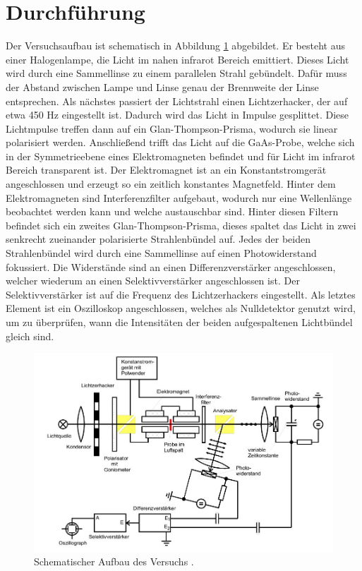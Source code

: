 \section{Durchführung}
\label{sec:Durchführung}
Der Versuchsaufbau ist schematisch in Abbildung \ref{fig:1} abgebildet.
Er besteht aus einer Halogenlampe, die Licht im nahen infrarot Bereich emittiert.
Dieses Licht wird durch eine Sammellinse zu einem parallelen Strahl gebündelt.
Dafür muss der Abstand zwischen Lampe und Linse genau der Brennweite der Linse entsprechen.
Als nächstes passiert der Lichtstrahl einen Lichtzerhacker, der auf etwa 450 Hz eingestellt ist. 
Dadurch wird das Licht in Impulse gesplittet. Diese Lichtmpulse treffen dann 
auf ein Glan-Thompson-Prisma, wodurch sie linear polarisiert werden. 
Anschließend trifft das Licht auf die GaAs-Probe, welche sich in 
der Symmetrieebene eines Elektromagneten befindet und für Licht im infrarot Bereich transparent ist.
Der Elektromagnet ist an ein Konstantstromgerät angeschlossen und erzeugt so ein 
zeitlich konstantes Magnetfeld.
Hinter dem Elektromagneten sind Interferenzfilter aufgebaut, 
wodurch nur eine Wellenlänge beobachtet werden kann und welche austauschbar sind. 
Hinter diesen Filtern befindet sich ein zweites Glan-Thompson-Prisma, 
dieses spaltet das Licht in zwei senkrecht zueinander polarisierte Strahlenbündel auf. 
Jedes der beiden Strahlenbündel wird durch eine Sammellinse auf einen Photowiderstand fokussiert.
Die Widerstände sind an einen Differenzverstärker angeschlossen, welcher wiederum an einen 
Selektivverstärker angeschlossen ist. Der Selektivverstärker ist auf die Frequenz des 
Lichtzerhackers eingestellt. Als letztes Element ist ein Oszilloskop angeschlossen, welches 
als Nulldetektor genutzt wird, um zu überprüfen, wann die Intensitäten der beiden aufgespaltenen 
Lichtbündel gleich sind.

\begin{figure}[H]
    \centering
    \includegraphics[width=1\textwidth]{Aufbau.jpg}
    \vspace{-10pt}
    \caption{Schematischer Aufbau des Versuchs \cite{Anleitung}.}
    \label{fig:1}
\end{figure}

